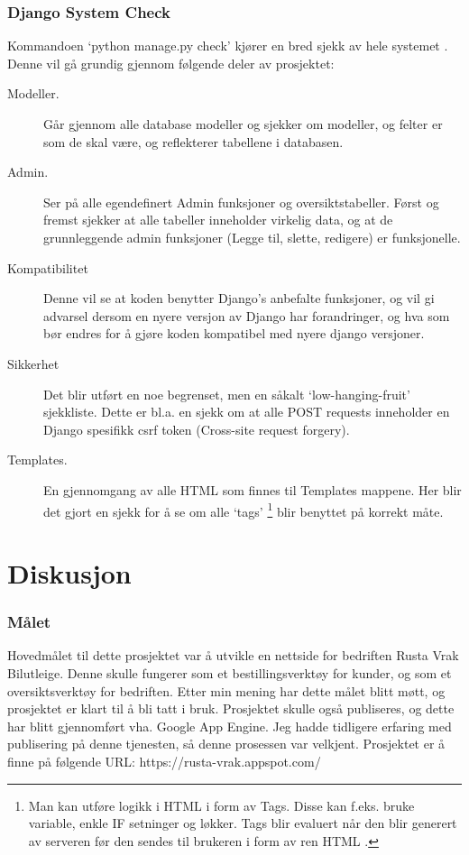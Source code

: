 \subsection{Django System Check}
Kommandoen ‘python manage.py check’ kjører en bred sjekk av hele systemet \citep{tests:django}. Denne vil gå grundig gjennom følgende deler av prosjektet:
\begin{description}
\item[Modeller.]Går gjennom alle database modeller og sjekker om modeller, og felter er som de skal være, og reflekterer tabellene i databasen.
\item[Admin.]Ser på alle egendefinert Admin funksjoner og oversiktstabeller. Først og fremst sjekker at alle tabeller inneholder virkelig data, og at de grunnleggende admin funksjoner (Legge til, slette, redigere) er funksjonelle.
\item[Kompatibilitet]Denne vil se at koden benytter Django’s anbefalte funksjoner, og vil gi advarsel dersom en nyere versjon av Django har forandringer, og hva som bør endres for å gjøre koden kompatibel med nyere django versjoner.
\item[Sikkerhet]Det blir utført en noe begrenset, men en såkalt ‘low-hanging-fruit’ sjekkliste. Dette er bl.a. en sjekk om at alle POST requests inneholder en Django spesifikk csrf token (Cross-site request forgery).
\item[Templates.]En gjennomgang av alle HTML som finnes til Templates mappene. Her blir det gjort en sjekk for å se om alle ‘tags’ \footnote{Man kan utføre logikk i HTML i form av Tags. Disse kan f.eks. bruke variable, enkle IF setninger og løkker. Tags blir evaluert når den blir generert av serveren før den sendes til brukeren i form av ren HTML \cite{django:tags}.} blir benyttet på korrekt måte.


\end{description}




\chapter{Diskusjon}

%
\subsection*{Målet}
Hovedmålet til dette prosjektet var å utvikle en nettside for bedriften Rusta Vrak Bilutleige. Denne skulle fungerer som et bestillingsverktøy for kunder, og som et oversiktsverktøy for bedriften. Etter min mening har dette målet blitt møtt, og prosjektet er klart til å bli tatt i bruk.
Prosjektet skulle også publiseres, og dette har blitt gjennomført vha. Google App Engine. Jeg hadde tidligere erfaring med publisering på denne tjenesten, så denne prosessen var velkjent. Prosjektet er å finne på følgende URL: https://rusta-vrak.appspot.com/ 
